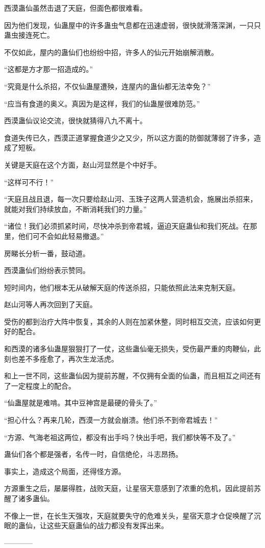 \begin{this_body}
西漠蛊仙虽然击退了天庭，但面色都很难看。

因为他们发现，仙蛊屋中的许多蛊虫气息都在迅速虚弱，很快就滑落深渊，一只只蛊虫接连死亡。

不仅如此，屋内的蛊仙们也纷纷中招，许多人的仙元开始崩解消散。

“这都是方才那一招造成的。”

“究竟是什么杀招，不仅仙蛊屋遭殃，连屋内的蛊仙都无法幸免？”

“应当有食道的奥义。真因为是这样，我们的仙蛊屋很难防范。”

西漠蛊仙议论交流，很快就猜得八九不离十。

食道失传已久，西漠正道掌握食道少之又少，所以这方面的防御就薄弱了许多，造成了短板。

关键是天庭在这个方面，赵山河显然是个中好手。

“这样可不行！”

“天庭且战且退，每一次只要给赵山河、玉珠子这两人营造机会，施展出杀招来，就能对我们持续放血，不断消耗我们的力量。”

“诸位！我们必须抓紧时间，尽快冲杀到帝君城，逼迫天庭蛊仙和我们死战。在那里，他们可不会如此轻易撤退。”

房睇长分析一番，鼓动道。

西漠蛊仙们纷纷表示赞同。

短时间内，他们根本无从破解天庭的传送杀招，只能依照此法来克制天庭。

赵山河等人再次回到了天庭。

受伤的都到治疗大阵中恢复，其余的人则在加紧休整，同时相互交流，应该如何更好的配合。

和西漠的诸多仙蛊屋狠狠打了一仗，这些蛊仙毫无损失，受伤最严重的肉鞭仙，此刻也差不多痊愈了，再次生龙活虎。

和上一世不同，这些蛊仙因为提前苏醒，不仅拥有全面的仙蛊，而且相互之间还有了一定程度上的配合。

“仙蛊屋就是难啃。其中豆神宫是最硬的骨头了。”

“担心什么？再来几轮，西漠一方就会崩溃。他们杀不到帝君城去！”

“方源、气海老祖这两位，都没有出手吗？快出手吧，我们都快等不及了。”

蛊仙们各个都是强者，名传一时，自信绝伦，斗志昂扬。

事实上，造成这个局面，还得怪方源。

方源重生之后，屡屡得胜，战败天庭，让星宿天意感到了浓重的危机，因此提前苏醒了诸多蛊仙。

不像上一世，在长生天强攻，天庭就要失守的危难关头，星宿天意才仓促唤醒了沉眠的蛊仙，让这些天庭蛊仙的战力都没有发挥出来。

------------

\end{this_body}

